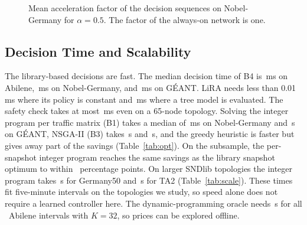 \documentclass[journal]{IEEEtran}
\begin{document}
\begin{figure}[t]
\centering
{}
\caption{Mean acceleration factor of the decision sequences on Nobel-Germany for $\alpha=0.5$. The factor of the always-on network is one.}
\label{fig:wear}
\end{figure}

\subsection{Decision Time and Scalability}\label{sec:res-time}

The library-based decisions are fast. The median decision time of B4 is \abiLatBFour\,ms on Abilene, \nobLatBFour\,ms on Nobel-Germany, and \geaLatBFour\,ms on G\'{E}ANT. LiRA needs less than 0.01\,ms where its policy is constant and \geaLatLiRA\,ms where a tree model is evaluated. The safety check takes at most \safetyTA\,ms even on a 65-node topology. Solving the integer program per traffic matrix (B1) takes a median of \nobIlpMs\,ms on Nobel-Germany and \geaIlpS\,s on G\'{E}ANT, NSGA-II (B3) takes \nobGaS\,s and \geaGaS\,s, and the greedy heuristic is faster but gives away part of the savings (Table~\ref{tab:opt}). On the subsample, the per-snapshot integer program reaches the same savings as the library snapshot optimum to within \boneGapPP\ percentage points. On larger SNDlib topologies the integer program takes \ilpGermany\,s for Germany50 and \ilpTA\,s for TA2 (Table~\ref{tab:scale}). These times fit five-minute intervals on the topologies we study, so speed alone does not require a learned controller here. The dynamic-programming oracle needs \dpRunAbi\,s for all \abiIntervals\ Abilene intervals with $K=32$, so prices can be explored offline.
\end{document}
